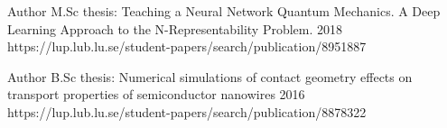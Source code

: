 


\begin{cventries}

\cventry
{Author} %
{M.Sc thesis: Teaching a Neural Network Quantum Mechanics. A Deep Learning Approach to the
N-Representability Problem.} %
{2018} %
{https://lup.lub.lu.se/student-papers/search/publication/8951887} %


\cventry
{Author} %
{B.Sc thesis: Numerical simulations of contact geometry effects on transport properties of semiconductor nanowires} %
{2016} %
{https://lup.lub.lu.se/student-papers/search/publication/8878322} %

\end{cventries}

